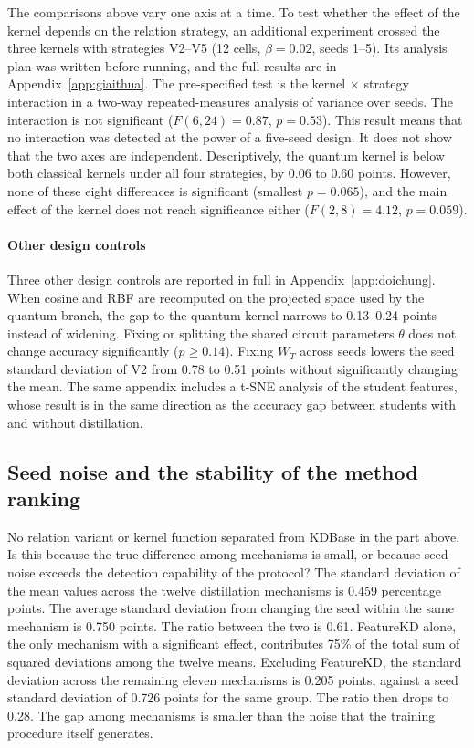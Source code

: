 The comparisons above vary one axis at a time. To test whether the effect of the kernel depends on the relation
strategy, an additional experiment crossed the three kernels with
strategies V2--V5 (12 cells, $\beta = 0.02$, seeds 1--5). Its analysis
plan was written before running, and the full results are in
Appendix~\ref{app:giaithua}. The pre-specified test is the kernel
$\times$ strategy interaction in a two-way repeated-measures analysis of
variance over seeds. The interaction is not significant
($F(6, 24) = 0.87$, $p = 0.53$). This result means that no interaction
was detected at the power of a five-seed design. It does not show that
the two axes are independent. Descriptively, the quantum kernel is below
both classical kernels under all four strategies, by 0.06 to 0.60
points. However, none of these eight differences is significant
(smallest $p = 0.065$), and the main effect of the kernel does not reach
significance either ($F(2, 8) = 4.12$, $p = 0.059$).

\paragraph{Other design controls}

Three other design controls are reported in full in
Appendix~\ref{app:doichung}. When cosine and RBF are recomputed on the
projected space used by the quantum branch, the gap to the quantum kernel
narrows to 0.13--0.24 points instead of widening. Fixing or splitting the
shared circuit parameters $\theta$ does not change accuracy significantly
($p \geq 0.14$). Fixing $W_T$ across seeds lowers the seed standard
deviation of V2 from 0.78 to 0.51 points without significantly changing
the mean. The same appendix includes a t-SNE analysis of the student
features, whose result is in the same direction as the accuracy gap
between students with and without distillation.

\subsection{Seed noise and the stability of the method ranking}
\label{sec:xephang}

No relation variant or kernel function separated from KDBase in the
part above. Is this because the true difference among mechanisms is small,
or because seed noise exceeds the detection capability of the protocol?
The standard deviation of the mean values across the twelve
distillation mechanisms is 0.459 percentage points. The average standard
deviation from changing the seed within the same mechanism is 0.750
points. The ratio between the two is 0.61. FeatureKD alone, the only
mechanism with a significant effect, contributes 75\% of the total sum
of squared deviations among the twelve means. Excluding FeatureKD, the standard deviation across the remaining eleven
mechanisms is 0.205 points, against a seed standard deviation of 0.726
points for the same group. The ratio then drops to 0.28. The gap among
mechanisms is smaller
than the noise that the training procedure itself generates.

